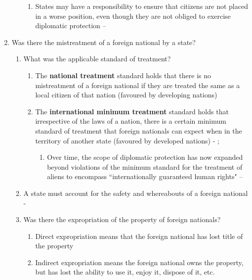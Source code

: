 \begin{enumerate}
\begin{enumerate}
\begin{enumerate}
            \item States may have a responsibility to ensure that citizens are not placed in a worse position, even though they are not obliged to exercise diplomatic protection -- 
        \end{enumerate}
    \end{enumerate}
    \item Was there the mistreatment of a foreign national by a state?
    \begin{enumerate}
        \item What was the applicable standard of treatment?
        \begin{enumerate}
            \item The \textbf{national treatment} standard holds that there is no mistreatment of a foreign national if they are treated the same as a local citizen of that nation (favoured by developing nations)
            \item The \textbf{international minimum treatment} standard holds that irrespective of the laws of a nation, there is a certain minimum standard of treatment that foreign nationals can expect when in the territory of another state (favoured by developed nations) - ; 
            \begin{enumerate}
                \item Over time, the scope of diplomatic protection has now expanded beyond violations of the minimum standard for the treatment of aliens to encompass ``internationally guaranteed human rights" -- 
            \end{enumerate}
        \end{enumerate}
        \item A state must account for the safety and whereabouts of a foreign national - 
        \item Was there the expropriation of the property of foreign nationals?
        \begin{enumerate}
            \item Direct expropriation means that the foreign national has lost title of the property
            \item Indirect expropriation means the foreign national owns the property, but has lost the ability to use it, enjoy it, dispose of it, etc.

\end{enumerate}
\end{enumerate}
\end{enumerate}
